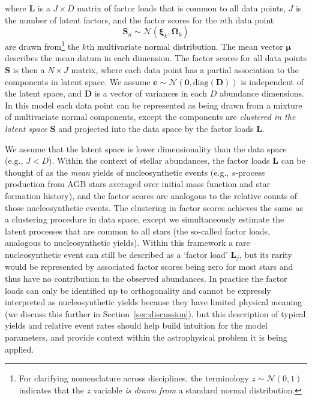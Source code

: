 \documentclass[twocolumn]{aastex62}
\newcommand{\vect}[1]{\boldsymbol{\mathbf{#1}}}
\renewcommand{\vec}[1]{\vect{#1}}
\newcommand{\factorloads}{\textbf{L}}
\newcommand{\factorscores}{\textbf{S}}
\newcommand{\specificvariance}{\vec{D}}
\newcommand{\NumData}{N}
\newcommand{\NumDimensions}{D}
\newcommand{\numdata}{n}
\newcommand{\NumLatentFactors}{J}
\newcommand{\numlatentfactors}{j}
\newcommand{\numcomponents}{k}
\begin{document}
\noindent{}where $\factorloads$ is a $\NumLatentFactors \times \NumDimensions$ 
matrix of factor loads that is common to all data points, $\NumLatentFactors$ is
the number of latent factors, and the factor scores 
for the $\numdata$th data point
\begin{equation}
	\factorscores_\numdata \sim \mathcal{N}(\vec\xi_\numcomponents, \vec\Omega_\numcomponents)
\end{equation}
\noindent{}are drawn from\footnote{For clarifying nomenclature across disciplines, the terminology $z \sim \mathcal{N}(0, 1)$ indicates that the $z$ variable \emph{is drawn from} a standard normal distribution.} the $\numcomponents$th multivariate normal distribution.
The mean vector $\vec\mu$ describes the mean datum in each dimension.
The factor scores for all data points $\factorscores$ is then a 
$\NumData \times \NumLatentFactors$ matrix, where each data point has a partial
association to the components in latent space. 
We assume $\vec{e} \sim \mathcal{N}\left(\vec{0}, \textrm{diag}(\specificvariance)\right)$
is independent of the latent space, and $\specificvariance$ is a
vector of variances in each $\NumDimensions$ abundance dimensions.
In this model each data point can be represented as being drawn
from a mixture of multivariate normal components, except the components
are \emph{clustered in the latent space} $\factorscores$ and projected
into the data space by the factor loads $\factorloads$. 


We assume that the latent space is lower dimensionality than the
data space (e.g., $\NumLatentFactors < \NumDimensions$).
Within the context of stellar abundances, the factor loads
$\factorloads$ can be thought of as the \emph{mean} yields
of nucleosynthetic
events (e.g., $s$-process production from AGB stars averaged over
initial mass function and star formation history), and the
factor scores are analogous to the relative counts of those 
nucleosynthetic events. The clustering in factor scores
achieves the same as a clustering procedure in data space,
except we simultaneously estimate the latent processes that are
common to all stars (the so-called factor loads, analogous to 
nucleosynthetic yields). Within this framework a rare nucleosynthetic event
can still be described as a `factor load' $\factorloads_\numlatentfactors$, 
but its rarity would be represented by associated factor
scores being zero for most stars and thus have no contribution
to the observed abundances. In practice the factor loads can only be 
identified up to orthogonality and cannot be expressly interpreted as
nucleosynthetic yields because they have limited physical meaning
(we discuss this further in Section~\ref{sec:discussion}),
but this description of typical yields and relative event rates should
help build intuition for the model parameters, and provide context
within the astrophysical problem it is being applied.
\end{document}
